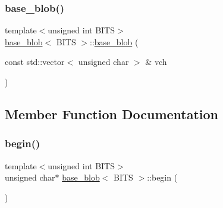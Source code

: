 \mbox{\label{classbase__blob_a874bc08d9039eb202fb2ab95dd9f49a0}} 
\subsubsection{\texorpdfstring{base\+\_\+blob()}{base\_blob()}\hspace{0.1cm}{\footnotesize\ttfamily [2/2]}}
{\footnotesize\ttfamily template$<$unsigned int B\+I\+TS$>$ \\
\mbox{\hyperlink{classbase__blob}{base\+\_\+blob}}$<$ B\+I\+TS $>$\+::\mbox{\hyperlink{classbase__blob}{base\+\_\+blob}} (\begin{DoxyParamCaption}\item[{const std\+::vector$<$ unsigned char $>$ \&}]{vch }\end{DoxyParamCaption})\hspace{0.3cm}{\ttfamily [explicit]}}



\subsection{Member Function Documentation}
\mbox{\label{classbase__blob_aeee68e00ceeacf49086e98b661e017ff}} 
\subsubsection{\texorpdfstring{begin()}{begin()}\hspace{0.1cm}{\footnotesize\ttfamily [1/2]}}
{\footnotesize\ttfamily template$<$unsigned int B\+I\+TS$>$ \\
unsigned char$\ast$ \mbox{\hyperlink{classbase__blob}{base\+\_\+blob}}$<$ B\+I\+TS $>$\+::begin (\begin{DoxyParamCaption}{ }\end{DoxyParamCaption})\hspace{0.3cm}{\ttfamily [inline]}}

\mbox{\label{classbase__blob_a7411db7de7bd5f396ff304de4e41a754}} 

